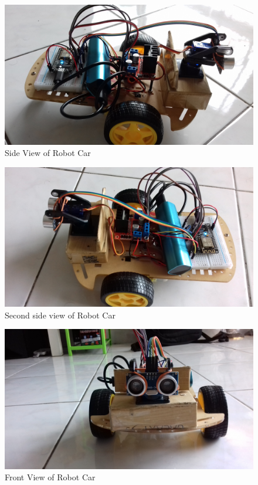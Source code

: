 \documentclass[sigconf]{acmart}
\begin{document}
\begin{figure}
	\includegraphics[width=1.0\columnwidth]{images/Side-view1.jpg}
	\caption{Side View of Robot Car}
\end{figure}

\begin{figure}
	\includegraphics[width=1.0\columnwidth]{images/Side-view2.jpg}
	\caption{Second side view of Robot Car}
\end{figure}

\begin{figure}
	\includegraphics[width=1.0\columnwidth]{images/Front-view.jpg}
	\caption{Front View of Robot Car}
\end{figure}
\end{document}
